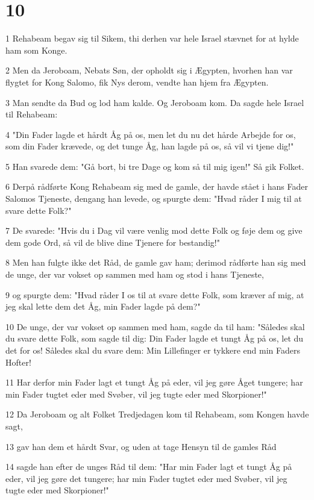 \chapter{10}

\par 1 Rehabeam begav sig til Sikem, thi derhen var hele Israel stævnet for at hylde ham som Konge.
\par 2 Men da Jeroboam, Nebats Søn, der opholdt sig i Ægypten, hvorhen han var flygtet for Kong Salomo, fik Nys derom, vendte han hjem fra Ægypten.
\par 3 Man sendte da Bud og lod ham kalde. Og Jeroboam kom. Da sagde hele Israel til Rehabeam:
\par 4 "Din Fader lagde et hårdt Åg på os, men let du nu det hårde Arbejde for os, som din Fader krævede, og det tunge Åg, han lagde på os, så vil vi tjene dig!"
\par 5 Han svarede dem: "Gå bort, bi tre Dage og kom så til mig igen!" Så gik Folket.
\par 6 Derpå rådførte Kong Rehabeam sig med de gamle, der havde stået i hans Fader Salomos Tjeneste, dengang han levede, og spurgte dem: "Hvad råder I mig til at svare dette Folk?"
\par 7 De svarede: "Hvis du i Dag vil være venlig mod dette Folk og føje dem og give dem gode Ord, så vil de blive dine Tjenere for bestandig!"
\par 8 Men han fulgte ikke det Råd, de gamle gav ham; derimod rådførte han sig med de unge, der var vokset op sammen med ham og stod i hans Tjeneste,
\par 9 og spurgte dem: "Hvad råder I os til at svare dette Folk, som kræver af mig, at jeg skal lette dem det Åg, min Fader lagde på dem?"
\par 10 De unge, der var vokset op sammen med ham, sagde da til ham: "Således skal du svare dette Folk, som sagde til dig: Din Fader lagde et tungt Åg på os, let du det for os! Således skal du svare dem: Min Lillefinger er tykkere end min Faders Hofter!
\par 11 Har derfor min Fader lagt et tungt Åg på eder, vil jeg gøre Åget tungere; har min Fader tugtet eder med Svøber, vil jeg tugte eder med Skorpioner!"
\par 12 Da Jeroboam og alt Folket Tredjedagen kom til Rehabeam, som Kongen havde sagt,
\par 13 gav han dem et hårdt Svar, og uden at tage Hensyn til de gamles Råd
\par 14 sagde han efter de unges Råd til dem: "Har min Fader lagt et tungt Åg på eder, vil jeg gøre det tungere; har min Fader tugtet eder med Svøber, vil jeg tugte eder med Skorpioner!"
